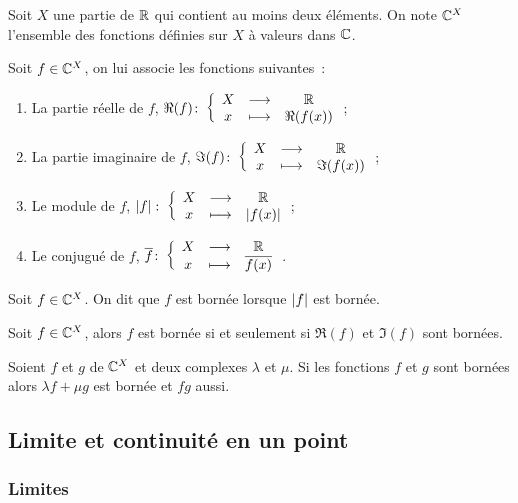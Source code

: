 Soit \(X\) une partie de \(\mathbb{R}\) qui contient au moins deux éléments. On note \(\mathbb{C}^X\) l'ensemble des fonctions définies sur \(X\) à valeurs dans \(\mathbb{C}\).

\begin{defdef}
  Soit \(f \in \mathbb{C}^X\), on lui associe les fonctions suivantes~:
  \begin{enumerate}
  \item La partie réelle de \(f\), \(\Re(f)\colon \left\{\begin{array}{ccc} X & \longrightarrow &\mathbb{R}\\ x & \longmapsto & \Re(f(x)) \end{array} \right.\);
  \item La partie imaginaire de \(f\), \(\Im(f)\colon \left\{\begin{array}{ccc} X & \longrightarrow &\mathbb{R}\\ x & \longmapsto & \Im(f(x)) \end{array} \right.\);
  \item Le module de \(f\), \(\left\lvert f\right\rvert\colon \left\{\begin{array}{ccc} X & \longrightarrow &\mathbb{R}\\ x & \longmapsto & \left\lvert f(x)\right\rvert \end{array} \right.\);
  \item Le conjugué de \(f\), \(\overline{f}\colon \left\{\begin{array}{ccc} X & \longrightarrow &\mathbb{R}\\ x & \longmapsto & \overline{f(x)} \end{array} \right.\).
  \end{enumerate}
\end{defdef}
\begin{defdef}
  Soit \(f \in \mathbb{C}^X\). On dit que \(f\) est bornée lorsque \(\left\lvert f\right\rvert\) est bornée.
\end{defdef}
\begin{prop}
  Soit \(f \in \mathbb{C}^X\), alors \(f\) est bornée si et seulement si \(\Re(f)\) et \(\Im(f)\) sont bornées.
\end{prop}
\begin{prop}
  Soient \(f\) et \(g\) de \(\mathbb{C}^X\) et deux complexes \(\lambda\) et \(\mu\). Si les fonctions \(f\) et \(g\) sont bornées alors \(\lambda f+\mu g\) est bornée et \(fg\) aussi.
\end{prop}

\subsection{Limite et continuité en un point}

\subsubsection{Limites}

